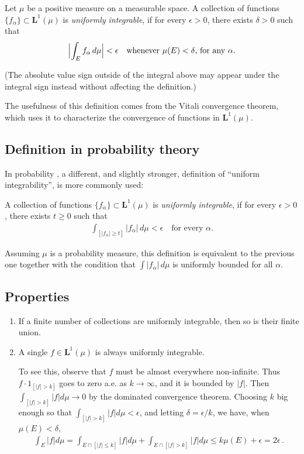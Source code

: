 \documentclass[12pt]{article}
\newcommand{\Le}{\mathbf{L}}
\providecommand{\abs}[1]{\lvert#1\rvert}
\providecommand{\absB}[1]{\Bigl\lvert#1\Bigr\rvert}
\providecommand{\defnterm}[1]{\emph{#1}}
\begin{document}
Let $\mu$ be a positive measure on a measurable space.
A collection of functions $\{ f_\alpha \} \subset \Le^1(\mu)$
is \defnterm{uniformly integrable}, if for every $\epsilon > 0$, there
exists $\delta > 0$ such that
\begin{align*}
\absB{ \int_E f_\alpha \, d\mu } < \epsilon \quad \textrm{whenever $\mu(E) < \delta$, for any $\alpha$.}
\end{align*}

(The absolute value sign outside of the integral above may appear under the integral sign instead without affecting the definition.)


The usefulness of this definition comes from the Vitali convergence theorem,
which uses it to characterize the convergence of functions
in $\Le^1(\mu)$.

\subsection*{Definition in probability theory}

In probability , a different, and slightly stronger, definition of ``uniform integrability'', is more commonly used:

A collection of functions $\{ f_\alpha \} \subset \Le^1(\mu)$
is \defnterm{uniformly integrable}, if for every $\epsilon > 0$, there
exists $t \geq 0$ such that
\begin{align*}
\int_{[\abs{f_\alpha} \geq t]} \abs{f_\alpha}  \, d\mu < \epsilon
\quad \textrm{for every $\alpha$.}
\end{align*}

Assuming $\mu$ is a probability measure, this definition is equivalent
to the previous one together with the condition that $\int \abs{f_\alpha} \, d\mu$ is uniformly bounded for all $\alpha$.

\subsection*{Properties}

\begin{enumerate}
\item
If a finite number of collections are uniformly integrable,
then so is their finite union.
\item
A single $f \in \Le^1(\mu)$ is always uniformly integrable.

To see this, observe that $f$ must be almost everywhere non-infinite.
Thus $f \cdot 1_{[ \abs{f} > k]}$ goes to zero a.e. as $k \to \infty$, and it is bounded
by $\abs{f}$.
Then $\int_{[\abs{f} > k]} \abs{f}d\mu \to 0$ by the dominated convergence theorem.
Choosing $k$ big enough so that $\int_{[\abs{f} > k]} \abs{f}d\mu < \epsilon$, and letting $\delta = \epsilon/k$, we have, when $\mu(E) < \delta$,
\begin{align*}
\int_E \abs{f}d\mu= \int_{E \cap [\abs{f} \leq k]} \abs{f}d\mu+ \int_{E \cap [\abs{f} > k]} \abs{f} d\mu
\leq k \mu(E) + \epsilon = 2\epsilon\,.
\end{align*}
\end{enumerate}
\end{document}
